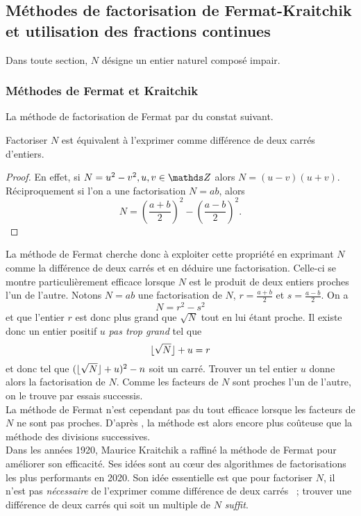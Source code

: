\subsection{Méthodes de factorisation de Fermat-Kraitchik et utilisation des
fractions continues}

Dans toute section, $N$ désigne un entier naturel composé impair.

\subsubsection{Méthodes de Fermat et Kraitchik}

La méthode de factorisation de Fermat par du constat suivant.

\begin{lemme}
	Factoriser $N$ est équivalent à l'exprimer comme différence de deux carrés
	d'entiers.
\end{lemme}

\begin{proof}
	En effet, si $N = u^2 - v^2, u, v\in \Z$ alors $N = (u-v)(u + v)$.
	Réciproquement si l'on a une factorisation $N = ab$, alors \[N =
	\left(\frac{a+b}{2}\right)^2 - \left(\frac{a-b}{2}\right)^2.\]
\end{proof}

La méthode de Fermat cherche donc à exploiter cette propriété en exprimant $N$
comme la différence de deux carrés et en déduire une factorisation. Celle-ci se
montre particulièrement efficace lorsque $N$ est le produit de deux entiers
proches l'un de l'autre. Notons $N=ab$ une factorisation de $N$,
$r=\frac{a+b}{2}$ et $s=\frac{a-b}{2}$. On a \[N = r^2 - s^2\] et que l'entier
$r$ est donc plus grand que $\sqrt{N}$ tout en lui étant proche. Il existe donc
un entier positif $u$ \emph{pas trop grand} tel que \[\lfloor\sqrt{N}\rfloor + u = r\]
et donc tel que $(\lfloor\sqrt{N}\rfloor + u)^2 - n$ soit un carré. Trouver un tel
entier $u$ donne alors la factorisation de $N$. Comme les facteurs de $N$ sont
proches l'un de l'autre, on le trouve par essais successis. \\

La méthode de Fermat n'est cependant pas du tout efficace lorsque les facteurs
de $N$ ne sont pas proches. D'après , la méthode est alors encore plus
coûteuse que la méthode des divisions successives. \\

Dans les années 1920, Maurice Kraitchik a raffiné la méthode de Fermat pour
améliorer son efficacité. Ses idées sont au cœur des algorithmes de
factorisations les plus performants en 2020. Son idée essentielle est que pour
factoriser $N$, il n'est pas \emph{nécessaire} de l'exprimer comme différence
de deux carrés ~; trouver une différence de deux carrés qui soit un multiple de
$N$ \emph{suffit}.

